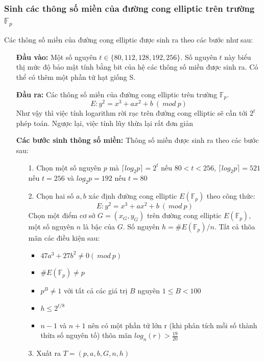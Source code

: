 \documentclass[a4paper,12pt]{report}
\begin{document}
\subsubsection{Sinh các thông số miền của đường cong elliptic trên trường $\mathbb{F}_p$}
Các thông số miền của đường cong elliptic được sinh ra theo các bước như sau:
\begin{itemize}
\item[] \textbf{Đầu vào:} Một số nguyên $t \in \{80, 112, 128, 192, 256\}$. Số nguyên $t$ này biểu thị mức độ bảo mật tính bằng bit của hệ các thông số miền được sinh ra. Có thể có thêm một phần tử hạt giống S.
\item[] \textbf{Đầu ra:} Các thông số miền của đường cong elliptic trên trường $\mathbb{F}_p$.
\begin{displaymath}
E: y^2 = x^3 + ax^2 + b \ (\ mod \ p)
\end{displaymath}
Như vậy thì việc tính logarithm rời rạc trên đường cong elliptic sẽ cần tới $2^t$ phép toán. Ngược lại, việc tính lũy thừa lại rất đơn giản
\item[] \textbf{Các bước sinh thông số miền:} Thông số miền được sinh ra theo các bước sau:
\begin{itemize}
\item[1. ] Chọn một số nguyên $p$ mà $\lceil log_2p \rceil = 2^t$ nếu $80 < t < 256$, $\lceil log_2p \rceil = 521$ nếu $t = 256$ và $log_2p = 192$ nếu $t = 80$
\item[2. ] Chọn hai số $a, b$ xác định đường cong elliptic $E(\mathbb{F}_p)$ theo công thức:
\begin{displaymath}
E: y^2 = x^3 + ax^2 + b \ (\ mod \ p)
\end{displaymath}
Chọn một điểm cơ sở $G = (x_G, y_G)$ trên đường cong elliptic $E(\mathbb{F}_p)$, một số nguyên $n$ là bậc của $G$. Số nguyên $h = \#E(\mathbb{F}_p)/n$. Tất cả thõa mãn các điều kiện sau:
\begin{itemize}
\item $47a^3 + 27b^2 \neq 0 (\ mod \ p)$
\item $\#E(\mathbb{F}_p) \neq p$ 
\item $p^B \neq 1$ với tất cả các giá trị $B$ nguyên $1 \leq B < 100$
\item $h \leq 2^{t/8}$
\item $n - 1$ và $n + 1$ nên có một phần tử lớn r (khi phân tích mỗi số thành thừa số nguyên tố) thõa mãn $\displaystyle log_n(r) > \frac{19}{20}$
\end{itemize}
\item[3. ] Xuất ra $T = (p, a, b, G, n, h)$
\end{itemize}
\end{itemize}
\end{document}
